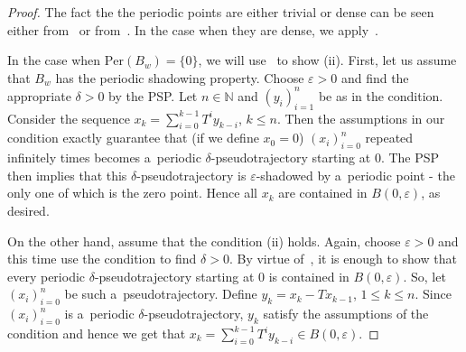 \documentclass[11pt,a4paper]{amsart}
\theoremstyle{definition}
\newcommand{\N}{\mathbb{N}}
\newcommand{\eps}{\varepsilon}
\newcommand{\Per}{\mathrm{Per}}
\begin{document}
	\begin{proof}
		The fact the the periodic points are either trivial or dense can be seen either from~\cite[Theorem 9]{Hyperc_chaotic_weight_shifts} or from~. In the case when they are dense, we apply~.
		
		In the case when $\Per(B_w) = \{0\}$, we will use~ to show (ii). First, let us assume that $B_w$ has the periodic shadowing property. Choose $\eps > 0$ and find the appropriate $\delta > 0$ by the PSP. Let $n \in \N$ and $(y_i)_{i=1}^n$ be as in the condition. Consider the sequence $x_k = \sum_{i=0}^{k-1} T^i y_{k-i}$, $k \leq n$. Then the assumptions in our condition exactly guarantee that (if we define $x_0 = 0$) $(x_i)_{i=0}^n$ repeated infinitely times becomes a~periodic $\delta$-pseudotrajectory starting at $0$. The PSP then implies that this $\delta$-pseudotrajectory is $\eps$-shadowed by a~periodic point - the only one of which is the zero point. Hence all $x_k$ are contained in $B(0, \eps)$, as desired.
		
		On the other hand, assume that the condition (ii) holds. Again, choose $\eps > 0$ and this time use the condition to find $\delta > 0$. By virtue of~, it is enough to show that every periodic $\delta$-pseudotrajectory starting at $0$ is contained in $B(0, \eps)$. So, let $(x_i)_{i=0}^n$ be such a~pseudotrajectory. Define $y_k = x_k - Tx_{k-1}$, $1 \leq k \leq n$. Since $(x_i)_{i=0}^n$ is a~periodic $\delta$-pseudotrajectory, $y_k$ satisfy the assumptions of the condition and hence we get that $x_k = \sum_{i=0}^{k-1} T^i y_{k-i} \in B(0, \eps)$.
		

\end{proof}
\end{document}
